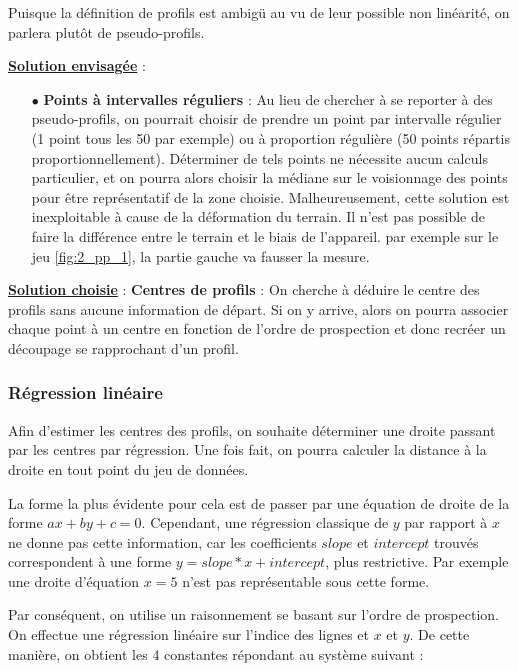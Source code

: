 \documentclass[12pt]{article}
\begin{document}
    Puisque la définition de profils est ambigü au vu de leur possible non linéarité, on parlera plutôt de pseudo-profils.

    \noindent\textbf{\underline{Solution envisagée}} :
    \begin{enumerate}
        \item[$\bullet$] \textbf{Points à intervalles réguliers} : Au lieu de chercher à se reporter à des pseudo-profils, on pourrait choisir de prendre un point par intervalle régulier (1 point tous les 50 par exemple) ou à proportion régulière (50 points répartis proportionnellement). Déterminer de tels points ne nécessite aucun calculs particulier, et on pourra alors choisir la médiane sur le voisionnage des points pour être représentatif de la zone choisie. Malheureusement, cette solution est inexploitable à cause de la déformation du terrain. Il n'est pas possible de faire la différence entre le terrain et le biais de l'appareil. par exemple sur le jeu \ref{fig:2_pp_1}, la partie gauche va fausser la mesure.
    \end{enumerate}
    \textbf{\underline{Solution choisie}} : \textbf{Centres de profils} : On cherche à déduire le centre des profils sans aucune information de départ. Si on y arrive, alors on pourra associer chaque point à un centre en fonction de l'ordre de prospection et donc recréer un découpage se rapprochant d'un profil.

    \subsubsection{Régression linéaire}

    Afin d'estimer les centres des profils, on souhaite déterminer une droite passant par les centres par régression. Une fois fait, on pourra calculer la distance à la droite en tout point du jeu de données.

    La forme la plus évidente pour cela est de passer par une équation de droite de la forme $ax + by + c = 0$. Cependant, une régression classique de $y$ par rapport à $x$ ne donne pas cette information, car les coefficients $slope$ et $intercept$ trouvés correspondent à une forme $y = slope*x + intercept$, plus restrictive. Par exemple une droite d'équation $x = 5$ n'est pas représentable sous cette forme.

    Par conséquent, on utilise un raisonnement se basant sur l'ordre de prospection. On effectue une régression linéaire sur l'indice des lignes et $x$ et $y$. De cette manière, on obtient les 4 constantes répondant au système suivant :
\end{document}
